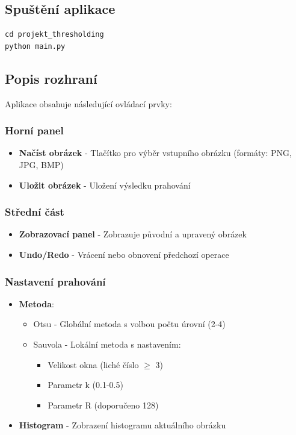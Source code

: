 \documentclass[12pt,a4paper]{article}
\begin{document}
\subsection{Spuštění aplikace}
\begin{verbatim}
cd projekt_thresholding
python main.py
\end{verbatim}

\subsection{Popis rozhraní}


Aplikace obsahuje následující ovládací prvky:

\subsubsection{Horní panel}
\begin{itemize}
\item \textbf{Načíst obrázek} - Tlačítko pro výběr vstupního obrázku (formáty: PNG, JPG, BMP)
\item \textbf{Uložit obrázek} - Uložení výsledku prahování
\end{itemize}

\subsubsection{Střední část}
\begin{itemize}
\item \textbf{Zobrazovací panel} - Zobrazuje původní a upravený obrázek
\item \textbf{Undo/Redo} - Vrácení nebo obnovení předchozí operace
\end{itemize}

\subsubsection{Nastavení prahování}
\begin{itemize}
\item \textbf{Metoda}:
\begin{itemize}
\item Otsu - Globální metoda s volbou počtu úrovní (2-4)
\item Sauvola - Lokální metoda s nastavením:
  \begin{itemize}
  \item Velikost okna (liché číslo $\geq$ 3)
  \item Parametr k (0.1-0.5)
  \item Parametr R (doporučeno 128)
  \end{itemize}
\end{itemize}
\item \textbf{Histogram} - Zobrazení histogramu aktuálního obrázku
\end{itemize}
\end{document}
